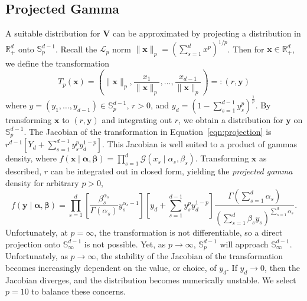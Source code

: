 \subsection{Projected Gamma\label{sec:pg}}
A suitable distribution for $\bm{V}$ can be approximated by projecting a 
    distribution in $\mathbb{R}_+^d$ onto $\mathbb{S}_{p}^{d-1}$.  
    Recall the $\mathcal{L}_p$ norm 
    $\lVert \bm{x}\rVert_p = \left(\sum_{s = 1}^dx^p\right)^{1/p}$.  Then
    for $\bm{x}\in\mathbb{R}_+^d$, we define the transformation
    \begin{equation}
        \label{eqn:projection}
        T_p(\bm{x}) = \left(\lVert \bm{x}\rVert_p, 
            \frac{x_1}{\lVert \bm{x}\rVert_p},\ldots, 
                \frac{x_{d-1}}{\lVert \bm{x}\rVert_p}\right)
                =: (r,\bm{y})
    \end{equation}
    where $y = (y_1,\ldots,y_{d-1}) \in \mathbb{S}_{p}^{d-1}$, $r > 0$, and 
    $y_d = (1 - \sum_{s = 1}^{d-1}y_{s}^p)^{\frac{1}{p}}$.
    By transforming $\bm{x}$ to $(r,\bm{y})$ and integrating out $r$, we
    obtain a distribution for $\bm{y}$ on $\mathbb{S}_{p}^{d-1}$.
    The Jacobian of the transformation in Equation~\eqref{eqn:projection} is
    $r^{d-1}[Y_d + \sum_{s = 1}^{d-1}y_{s}^py_d^{1-p}]$.
    This Jacobian is well suited to a product of gammas density, where 
    $f(\bm{x}\mid\bm{\alpha},\bm{\beta}) = 
        \prod_{s = 1}^d\mathcal{G}(x_{s}\mid\alpha_{s},\beta_{s})$.
    Transforming $\bm{x}$ as described, $r$ can be integrated out in closed
    form, yielding the \emph{projected gamma} density for arbitrary $p > 0$,
    \[
        f(\bm{y}\mid\bm{\alpha},\bm{\beta}) = \prod_{s = 1}^d\left[
            \frac{\beta_{s}^{\alpha_{s}}}{\Gamma(\alpha_{s})}
            y_{s}^{\alpha_{s} - 1}\right]
            \left[y_d + \sum_{s = 1}^{d-1}y_{s}^py_d^{1-p}\right]
            \frac{\Gamma(\sum_{s = 1}^d \alpha_{s})}{\left(
                \sum_{s = 1}^d\beta_{s}y_{s}
                \right)^{\sum_{s = 1}^d \alpha_{s}}
            }.
    \]
    Unfortunately, at $p=\infty$, the transformation is not differentiable, so a 
    direct projection onto $\mathbb{S}_{\infty}^{d-1}$ is not possible. Yet,
    as $p\to\infty$, $\mathbb{S}_{p}^{d-1}$  will approach $\mathbb{S}_{\infty}^{d-1}$.
    Unfortunately, as $p\to\infty$, the stability of the Jacobian of the transformation 
    becomes increasingly dependent on the value, or choice, of $y_d$.  If 
    $y_d\to 0$, then the Jacobian diverges, and the distribution becomes numerically 
    unstable. We select $p = 10$ to balance these concerns.

